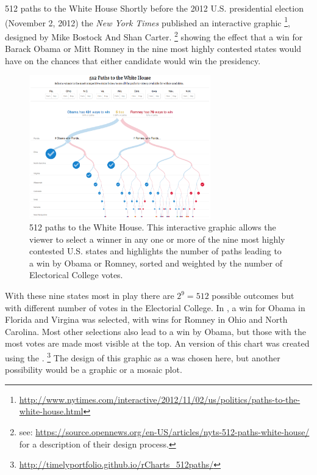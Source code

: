 \documentclass[11pt]{book}
\begin{document}
\begin{Example}[512paths]{512 paths to the White House}
Shortly before the 2012 U.S. presidential election (November 2, 2012) 
the \emph{New York Times} published an interactive graphic%
\footnote{\url{http://www.nytimes.com/interactive/2012/11/02/us/politics/paths-to-the-white-house.html}},
designed by Mike Bostock And Shan Carter.%
\footnote{
see: \url{https://source.opennews.org/en-US/articles/nyts-512-paths-white-house/}
for a description of their design process.}
showing
the effect that a win for Barack Obama or Mitt Romney in the
nine most highly contested states would have on the chances
that either candidate would win the presidency.

\begin{figure}
\centering
\includegraphics[width=0.7\textwidth]{ch01/fig/nyt_512paths.png}
\caption{512 paths to the White House.  This interactive graphic allows the viewer to
select a winner in any one or more of the nine most highly contested U.S. states
and highlights the number of paths leading to a win by Obama or Romney, sorted and
weighted
by the number of Electorical College votes.}
\label{fig:nyt_512paths}
\end{figure}

With these nine states most in play there are $2^9 = 512$ possible outcomes
but with different number of votes in the Electorial College. 
In , a win for Obama in Florida and Virgina was
selected, with wins for Romney in Ohio and North Carolina.
Most other selections also lead to a win by Obama, but those with
the most votes are made most visible at the top.
An \R version of this chart was created using the .%
\footnote{
\url{http://timelyportfolio.github.io/rCharts_512paths/}
}
The design of this graphic as a  was chosen here, but
another possibility would be a  graphic
\citep{Shneiderman:92} or a mosaic plot.


\end{Example}
\end{document}
